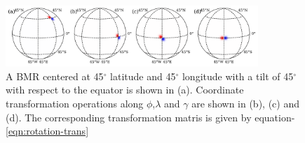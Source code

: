 \begin{figure}
    \centering
    \includegraphics[width=0.85\textwidth]{rotation_bmr.png}
    \caption{A BMR centered at 45$^{\circ}$ latitude and 45$^{\circ}$ longitude with a tilt of 45$^{\circ}$ with respect to the equator is shown in (a). Coordinate transformation operations along $\phi$,$\lambda$ and $\gamma$ are shown in (b), (c) and (d). The corresponding transformation matris is given by equation-\ref{eqn:rotation-trans}}
    \label{fig:rotation-bmr}
\end{figure}






